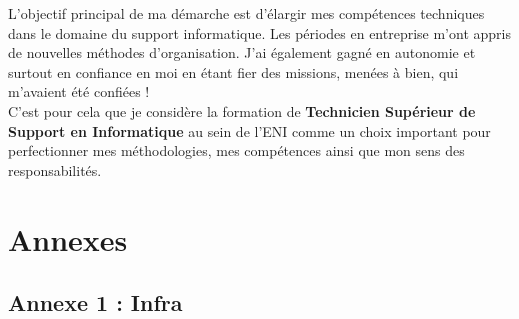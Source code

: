 \documentclass[11pt,a4paper,oneside]{article}
\begin{document}
L’objectif principal de ma démarche est d’élargir mes compétences techniques dans le domaine du support informatique. Les périodes en entreprise m’ont appris de nouvelles méthodes d’organisation. J’ai également gagné en autonomie et surtout en confiance en moi en étant fier des missions, menées à bien, qui m’avaient été confiées ! \\

C’est pour cela que je considère la formation de \textbf{Technicien Supérieur de Support en Informatique} au sein de l’ENI comme un choix important pour perfectionner mes méthodologies, mes compétences ainsi que mon sens des responsabilités.
\newpage

\section{Annexes}
\label{sec:Annexes}
\subsection{Annexe 1 : Infra}
\end{document}
